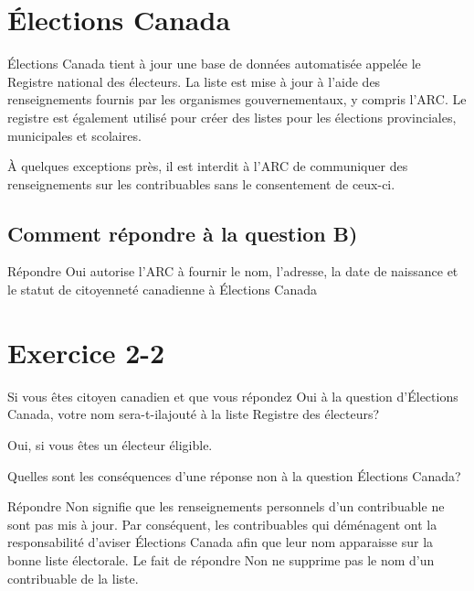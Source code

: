 \begin{question}
	
\end{question}





\section{Élections Canada}
\begin{intro}
	Élections Canada tient à jour une base de données automatisée appelée le Registre national des électeurs. La liste est mise à jour à l'aide des renseignements fournis par les organismes gouvernementaux, y compris l'ARC. Le registre est également utilisé pour créer des listes pour les élections provinciales, municipales et scolaires.
\end{intro}
À quelques exceptions près, il est interdit à l'ARC de communiquer des renseignements sur les contribuables sans le consentement de ceux-ci.


\subsection{Comment répondre à la question B)}
Répondre \og Oui\fg{} autorise l'ARC à fournir le nom, l'adresse, la date de naissance et le statut de citoyenneté canadienne à Élections Canada



\section{Exercice 2-2}
\setcounter{question}{0}
\begin{question}
	Si vous êtes citoyen canadien et que vous répondez \og Oui\fg{} à la question d'Élections Canada, votre nom sera-t-ilajouté à la liste Registre des électeurs?
\end{question}
Oui, si vous êtes un électeur éligible.

\begin{question}
	Quelles sont les conséquences d'une réponse \og non\fg{} à la question Élections Canada?
\end{question}
Répondre \og Non\fg{} signifie que les renseignements personnels d'un contribuable ne sont pas mis à jour. Par conséquent, les contribuables qui déménagent ont la responsabilité d'aviser Élections Canada afin que leur nom apparaisse sur la bonne liste électorale. Le fait de répondre \og Non\fg{} ne supprime pas le nom d'un contribuable de la liste.



